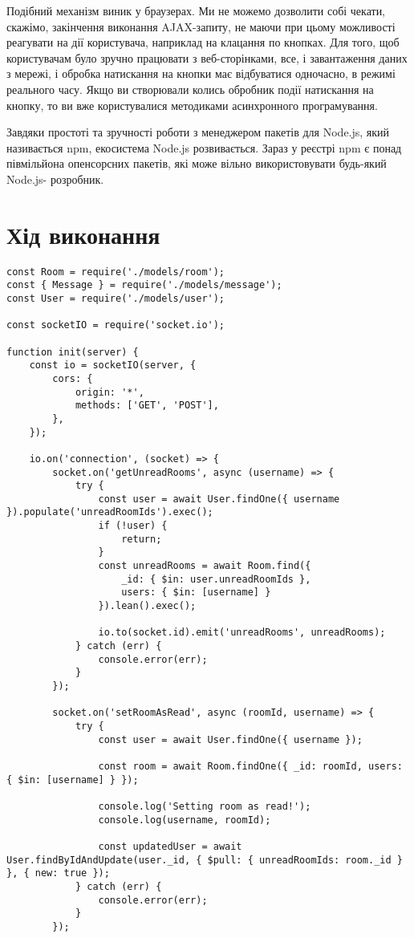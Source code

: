 \documentclass{article}
\begin{document}
\begin{normalsize}
Подібний механізм виник у браузерах. Ми не можемо дозволити собі чекати, скажімо,
закінчення виконання AJAX-запиту, не маючи при цьому можливості реагувати на дії
користувача, наприклад на клацання по кнопках. Для того, щоб користувачам було зручно
працювати з веб-сторінками, все, і завантаження даних з мережі, і обробка натискання на
кнопки має відбуватися одночасно, в режимі реального часу.
Якщо ви створювали колись обробник події натискання на кнопку, то ви вже
користувалися методиками асинхронного програмування.

Завдяки простоті та зручності роботи з менеджером пакетів для Node.js, який
називається npm, екосистема Node.js розвивається. Зараз у реєстрі npm є понад
півмільйона опенсорсних пакетів, які може вільно використовувати будь-який Node.js-
розробник.

\section*{Хід виконання}
\begin{lstlisting}
const Room = require('./models/room');
const { Message } = require('./models/message');
const User = require('./models/user');

const socketIO = require('socket.io');

function init(server) {
	const io = socketIO(server, {
		cors: {
			origin: '*',
			methods: ['GET', 'POST'],
		},
	});
	
	io.on('connection', (socket) => {
		socket.on('getUnreadRooms', async (username) => {
			try {
				const user = await User.findOne({ username }).populate('unreadRoomIds').exec();
				if (!user) {
					return;
				}
				const unreadRooms = await Room.find({
					_id: { $in: user.unreadRoomIds },
					users: { $in: [username] }
				}).lean().exec();
				
				io.to(socket.id).emit('unreadRooms', unreadRooms);
			} catch (err) {
				console.error(err);
			}
		});
		
		socket.on('setRoomAsRead', async (roomId, username) => {
			try {
				const user = await User.findOne({ username });
				
				const room = await Room.findOne({ _id: roomId, users: { $in: [username] } });
				
				console.log('Setting room as read!');
				console.log(username, roomId);
				
				const updatedUser = await User.findByIdAndUpdate(user._id, { $pull: { unreadRoomIds: room._id } }, { new: true });
			} catch (err) {
				console.error(err);
			}
		});
		

\end{lstlisting}
\end{normalsize}
\end{document}

